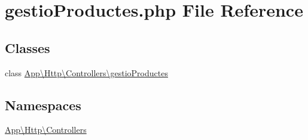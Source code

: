 \hypertarget{gestio_productes_8php}{}\section{gestio\+Productes.\+php File Reference}
\label{gestio_productes_8php}
\subsection*{Classes}
\begin{DoxyCompactItemize}
\item 
class \mbox{\hyperlink{class_app_1_1_http_1_1_controllers_1_1gestio_productes}{App\textbackslash{}\+Http\textbackslash{}\+Controllers\textbackslash{}gestio\+Productes}}
\end{DoxyCompactItemize}
\subsection*{Namespaces}
\begin{DoxyCompactItemize}
\item 
 \mbox{\hyperlink{namespace_app_1_1_http_1_1_controllers}{App\textbackslash{}\+Http\textbackslash{}\+Controllers}}
\end{DoxyCompactItemize}
